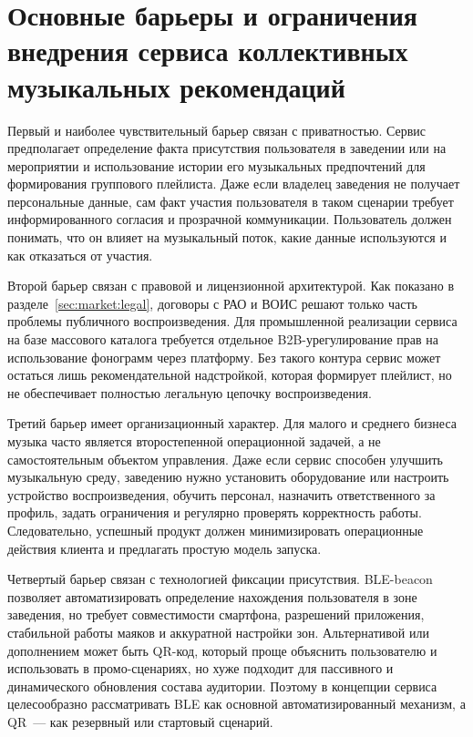 \section{Основные барьеры и ограничения внедрения сервиса коллективных музыкальных рекомендаций}
\label{sec:market:barriers}

Первый и наиболее чувствительный барьер связан с приватностью. Сервис предполагает определение факта присутствия пользователя в заведении или на мероприятии и использование истории его музыкальных предпочтений для формирования группового плейлиста. Даже если владелец заведения не получает персональные данные, сам факт участия пользователя в таком сценарии требует информированного согласия и прозрачной коммуникации. Пользователь должен понимать, что он влияет на музыкальный поток, какие данные используются и как отказаться от участия.

Второй барьер связан с правовой и лицензионной архитектурой. Как показано в разделе~\ref{sec:market:legal}, договоры с РАО и ВОИС решают только часть проблемы публичного воспроизведения. Для промышленной реализации сервиса на базе массового каталога требуется отдельное B2B-урегулирование прав на использование фонограмм через платформу. Без такого контура сервис может остаться лишь рекомендательной надстройкой, которая формирует плейлист, но не обеспечивает полностью легальную цепочку воспроизведения.

Третий барьер имеет организационный характер. Для малого и среднего бизнеса музыка часто является второстепенной операционной задачей, а не самостоятельным объектом управления. Даже если сервис способен улучшить музыкальную среду, заведению нужно установить оборудование или настроить устройство воспроизведения, обучить персонал, назначить ответственного за профиль, задать ограничения и регулярно проверять корректность работы. Следовательно, успешный продукт должен минимизировать операционные действия клиента и предлагать простую модель запуска.

Четвертый барьер связан с технологией фиксации присутствия. BLE-beacon позволяет автоматизировать определение нахождения пользователя в зоне заведения, но требует совместимости смартфона, разрешений приложения, стабильной работы маяков и аккуратной настройки зон. Альтернативой или дополнением может быть QR-код, который проще объяснить пользователю и использовать в промо-сценариях, но хуже подходит для пассивного и динамического обновления состава аудитории. Поэтому в концепции сервиса целесообразно рассматривать BLE как основной автоматизированный механизм, а QR~--- как резервный или стартовый сценарий.

